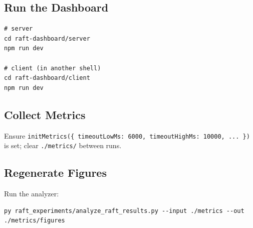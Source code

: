 \documentclass[11pt]{article}
\begin{document}
\subsection*{Run the Dashboard}
\begin{verbatim}
# server
cd raft-dashboard/server
npm run dev

# client (in another shell)
cd raft-dashboard/client
npm run dev
\end{verbatim}

\subsection*{Collect Metrics}
Ensure
\texttt{initMetrics(\{ timeoutLowMs: 6000, timeoutHighMs: 10000, ... \})}
is set; clear \texttt{./metrics/} between runs.

\subsection*{Regenerate Figures}
Run the analyzer:
\begin{verbatim}
py raft_experiments/analyze_raft_results.py --input ./metrics --out ./metrics/figures
\end{verbatim}



\end{document}
